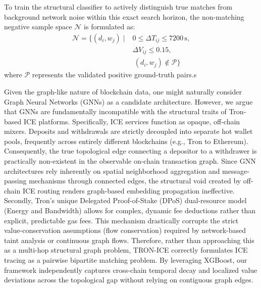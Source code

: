 \documentclass[journal]{IEEEtran}
\begin{document}
    To train the structural classifier to actively distinguish true matches from background network noise within this exact search horizon, the non-matching negative sample space $\mathcal{N}$ is formulated as:
    \begin{equation}
    \label{eq:negative_space}
    \begin{split}
    \mathcal{N} = \Big\{ (d_i, w_j) \;\Big|\; & 0 \le \Delta T_{ij} \le 7200\,\text{s}, \\
    & \Delta V_{ij} \le 0.15, \\ 
    & \ (d_i, w_j) \notin \mathcal{P} \Big\}
    \end{split}
    \end{equation}
    where $\mathcal{P}$ represents the validated positive ground-truth pairs.s
    
    Given the graph-like nature of blockchain data, one might naturally consider Graph Neural Networks (GNNs) as a candidate architecture. However, we argue that GNNs are fundamentally incompatible with the structural traits of Tron-based ICE platforms. Specifically, ICE services function as opaque, off-chain mixers. Deposits and withdrawals are strictly decoupled into separate hot wallet pools, frequently across entirely different blockchains (e.g., Tron to Ethereum). Consequently, the true topological edge connecting a depositor to a withdrawer is practically non-existent in the observable on-chain transaction graph. Since GNN architectures rely inherently on spatial neighborhood aggregation and message-passing mechanisms through connected edges, the structural void created by off-chain ICE routing renders graph-based embedding propagation ineffective. Secondly, Tron's unique Delegated Proof-of-Stake (DPoS) dual-resource model (Energy and Bandwidth) allows for complex, dynamic fee deductions rather than explicit, predictable gas fees. This mechanism drastically corrupts the strict value-conservation assumptions (flow conservation) required by network-based taint analysis or continuous graph flows. Therefore, rather than approaching this as a multi-hop structural graph problem, TRON-ICE correctly formulates ICE tracing as a pairwise bipartite matching problem. By leveraging XGBoost, our framework independently captures cross-chain temporal decay and localized value deviations across the topological gap without relying on contiguous graph edges.
    
\end{document}
